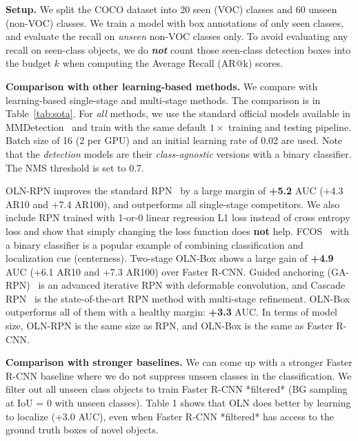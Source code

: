 \documentclass[10pt,twocolumn,letterpaper]{article}
\newcommand{\tableref}[1]{Table~\ref{#1}}
\renewcommand{\paragraph}[1]{\vspace{1mm}\noindent\textbf{#1}}
\begin{document}
\paragraph{Setup.} \quad 
We split the COCO dataset into 20 seen (VOC) classes and 60 unseen (non-VOC) classes. We train a model with box annotations of only seen classes, and evaluate the recall on \textit{unseen} non-VOC classes only. To avoid evaluating any recall on seen-class objects, we do \textit{\textbf{not}} count those seen-class detection boxes into the budget $k$ when computing the Average Recall (AR@k) scores. 


\paragraph{Comparison with other learning-based methods.} \quad 
We compare with learning-based single-stage and multi-stage methods. The comparison is in \tableref{tab:sota}. For \textit{all} methods, we use the standard official models available in MMDetection~\cite{mmdetection} and train with the same default $1\times$ training and testing pipeline. Batch size of 16 (2 per GPU) and an initial learning rate of 0.02 are used. Note that the \textit{detection} models are their \textit{class-agnostic} versions with a binary classifier. The NMS threshold is set to 0.7.

OLN-RPN improves the standard RPN~\cite{fasterNIPS2015} by a large margin of \textbf{+5.2} AUC (+4.3 AR10 and +7.4 AR100), and outperforms all single-stage competitors. We also include RPN trained with 1-or-0 linear regression L1 loss instead of cross entropy loss and show that simply changing the loss function does \textbf{not} help. FCOS~\cite{tian2019fcos} with a binary classifier is a popular example of combining classification and localization cue (centerness). Two-stage OLN-Box shows a large gain of \textbf{+4.9} AUC (+6.1 AR10 and +7.3 AR100) over Faster R-CNN. Guided anchoring (GA-RPN)~\cite{wang2019region} is an advanced iterative RPN with deformable convolution, and Cascade RPN~\cite{vu2019cascade} is the state-of-the-art RPN method with multi-stage refinement. OLN-Box outperforms all of them with a healthy margin: \textbf{+3.3} AUC. In terms of model size, OLN-RPN is the same size as RPN, and OLN-Box is the same as Faster R-CNN.

\paragraph{Comparison with stronger baselines.} \quad
We can come up with a stronger Faster R-CNN baseline where we do not suppress unseen classes in the classification. We filter out all unseen class objects to train Faster R-CNN *filtered* (BG sampling at IoU = 0 with unseen classes). Table 1 shows that OLN does better by learning to localize (+3.0 AUC), even when Faster R-CNN *filtered* has access to the ground truth boxes of novel objects.
\end{document}
